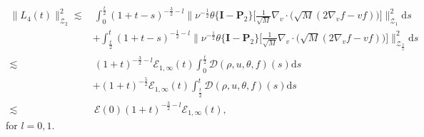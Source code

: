 \documentclass[reqno,11pt]{amsart}
\theoremstyle{plain}
\numberwithin{equation}{section}
\begin{document}
\begin{align}\label{G5.73}
\| L_4(t)\|_{\mathcal{Z}_2}^2   \lesssim&\,  \int_0^{\frac{t}{2}}(1+t-s)^{-\frac{3}{2}-l}
\Big\|\nu^{-\frac{1}{2}}  \theta \{\mathbf{I} - \mathbf{P}_2\} \Big[\frac{1}{\sqrt{M}} \nabla_v \cdot \big(\sqrt{M} (2 \nabla_v f - v f)\big)\Big]\Big\|_{\mathcal{Z}_1}^2\mathrm{d}s\nonumber\\
&+  \int_{\frac{t}{2}}^{t}(1+t-s)^{-\frac{1}{2}-l}
\Big\|\nu^{-\frac{1}{2}}  \theta \{\mathbf{I} - \mathbf{P}_2\} \Big[\frac{1}{\sqrt{M}} \nabla_v \cdot \big(\sqrt{M} (2 \nabla_v f - v f)\big)\Big]\Big\|_{\mathcal{Z}_{\frac{3}{2}}}^2\mathrm{d}s\nonumber\\
\lesssim&\, (1+t)^{-\frac{3}{2}-l}\mathcal{E} _{1,\infty}(t)\int_0^{\frac{t}{2}}
\mathcal{D}(\rho,u,\theta,f)(s)\mathrm{d}s \nonumber\\ &+(1+t)^{-\frac{5}{2}}\mathcal{E}_{1,\infty}(t)\int_{\frac{t}{2}}^t\mathcal{D}(\rho,u,\theta,f)(s)\mathrm{d}s\nonumber\\
\lesssim&\, \mathcal{E}(0)(1+t)^{-\frac{3}{2}-l}\mathcal{E}_{1,\infty}(t),
\end{align}
for $l=0,1$.
\end{document}
